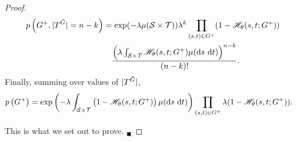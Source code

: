 \documentclass{statsoc}
\begin{document}
\begin{proof}
{%
\begin{align}
  p\left(G^+, |T^{\tilde{G}}|=n-k \right)  &=  \exp(-\lambda \mu(\cS \times \cT))
             \lambda^{k}  \prod_{(s,t) \in G^+} (1- \mathscr{H}_{\theta}(s,t;G^+)) \nonumber \\
          & \quad \frac{\left( \lambda \int_{\cS \times \cT} \mathscr{H}_{\theta}(s,t;G^+)\mu(\dif s\ \dif t) \right)^{n-k}}{(n-k)!}.  %
\end{align}
Finally, summing over values of $|T^{\tilde{G}}|$,}
\begin{align}
 p\left(G^+ \right)  %
           &=   \exp\left(-\lambda  \int_{\cS \times \cT} \left(1 -  \mathscr{H}_{\theta}(s,t;G^+) \right) \mu(\dif s\ \dif t)  \right)
                 \prod_{(s,t) \in G^+} \lambda (1- \mathscr{H_{\theta}}(s,t;G^+)).
\end{align}


This is what we set out to prove. \hfill ${}_\blacksquare$
\end{proof}


\end{document}
